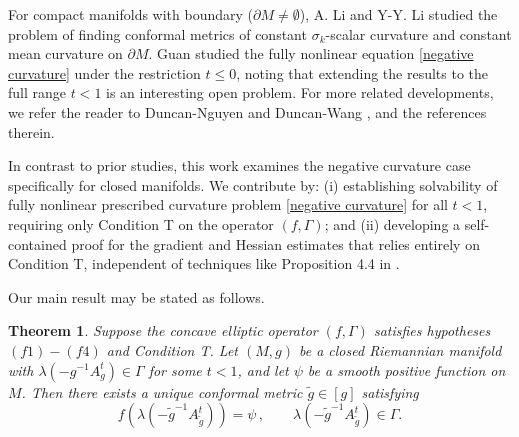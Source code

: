 \documentclass{article}
\theoremstyle{plain}
\newtheorem{theorem}{Theorem}[section]
\theoremstyle{definition}
\theoremstyle{definition}
\numberwithin{equation}{section}
\begin{document}
\begin{sloppypar}
For compact manifolds with boundary ($\partial M \neq \emptyset$), A. Li and Y-Y. Li \cite{LL03b} studied the problem of finding conformal metrics of constant $\sigma_k$-scalar curvature and constant mean curvature on $\partial M$. Guan \cite{Guan08} studied the fully nonlinear equation \eqref{negative curvature} under the restriction $t \leq 0$, noting that extending the results to the full range $t < 1$ is an interesting open problem. For more related developments,  we refer the reader to Duncan-Nguyen \cite{DL25,DL26} and Duncan-Wang \cite{DW25}, and the references therein.\medskip

In contrast to prior studies, this work examines the negative curvature case specifically for closed manifolds. We contribute by: (i) establishing solvability of fully nonlinear prescribed curvature problem \eqref{negative curvature} for all $t < 1$, requiring only Condition T on the operator $(f, \Gamma)$; and (ii) developing a self-contained proof for the gradient and Hessian estimates that relies entirely on Condition T, independent of techniques like Proposition 4.4 in \cite{GV03}.
\medskip

Our main result may be stated as follows.
\begin{theorem}\label{main}
Suppose the concave elliptic operator $(f,\Gamma)$ satisfies hypotheses $(f1)-(f4)$ and Condition T. Let $(M,g)$ be a closed Riemannian manifold with $\lambda(-g^{-1}A_{g}^{t})\in \Gamma$ for some $t<1$, and let $\psi$ be a smooth positive function on $M$. Then there exists a unique conformal metric $\tilde{g}\in [g]$ satisfying
\begin{equation}\label{curvature problem}
f(\lambda(-\tilde{g}^{-1}A_{\tilde{g}}^{t}))=\psi\,, \qquad \lambda(-\tilde{g}^{-1}A_{\tilde{g}}^{t})\in \Gamma.
\end{equation}
\end{theorem}


\end{sloppypar}
\end{document}
